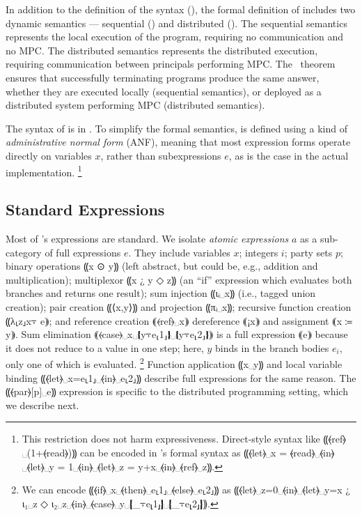 In addition to the definition of the syntax (), the formal definition of \mpc
includes two dynamic semantics --- sequential () and distributed ().
The sequential semantics represents the local execution of the program, requiring no communication
and no MPC. The distributed semantics represents the distributed execution, requiring communication
between principals performing MPC. The~ theorem ensures that successfully
terminating programs produce the same answer, whether they are executed locally (sequential semantics),
or deployed as a distributed system performing MPC (distributed semantics).

The syntax of \mpc is in . To simplify the formal semantics,
\mpc is defined using a kind of \emph{administrative normal form} (ANF), meaning
that most expression forms operate directly on variables $x$, rather than subexpressions $e$,
as is the case in the actual implementation.
\footnote{ This restriction does not harm expressiveness. Direct-style syntax like ⸨⦑ref⦒␣(1+⦑read⦒)⸩
can be encoded in \mpc's formal syntax as ⸨⦑let⦒␣x = ⦑read⦒␣⦑in⦒␣⦑let⦒␣y = 1␣⦑in⦒␣⦑let⦒␣z = y+x␣⦑in⦒␣⦑ref⦒␣z⸩. }


\subsection{Standard Expressions}
\label{subsec:mpc-design-standard}

Most of \mpc's expressions are standard. We isolate \emph{atomic expressions} $a$
as a sub-category of full expressions $e$. They include
variables $x$;
integers $i$;
party sets $p$;
binary operations ⸨x ⊙ y⸩ (left abstract, but could be, e.g., addition and multiplication);
multiplexor ⸨x ¿ y ◇ z⸩ (an “if” expression which evaluates both branches and returns one result);
sum injection ⸨ιᵢ␣x⸩ (i.e., tagged union creation);
pair creation ⸨⟨x,y⟩⸩ and projection ⸨πᵢ␣x⸩;
recursive function creation ⸨λ⸤z⸥x⍪ e⸩;
and reference creation ⸨⦑ref⦒␣x⸩ dereference ⸨¡x⸩ and assignment ⸨x ≔ y⸩.
Sum elimination ⸨⦑case⦒␣x␣❴y⍪e⸤1⸥❵␣❴y⍪e⸤2⸥❵⸩ is a full expression ⸨e⸩
because it does not reduce to a value in one step; here, $y$ binds in
the branch bodies $e_i$, only one of which is evaluated.
\footnote{ We can encode ⸨⦑if⦒␣x␣⦑then⦒␣e⸤1⸥␣⦑else⦒␣e⸤2⸥⸩ as
⸨⦑let⦒␣z=0␣⦑in⦒␣⦑let⦒␣y=x ¿ ι₁␣z ◇ ι₂␣z␣⦑in⦒␣⦑case⦒␣y␣❴\_⍪e⸤1⸥❵␣❴\_⍪e⸤2⸥❵⸩. }
Function application ⸨x␣y⸩ and local variable binding ⸨⦑let⦒␣x=e⸤1⸥␣⦑in⦒␣e⸤2⸥⸩
describe full expressions for the same reason. The ⸨⦑par⦒[p]␣e⸩ expression
is specific to the distributed programming setting, which we describe next.

